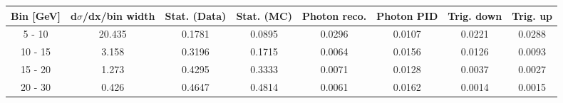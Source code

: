 \documentclass{article}
\begin{document}
\begin{table}[H]
\begin{adjustbox}{width=1\textwidth}
\begin{tabular}{|c|c|c|c|c|c|c|c|}
\hline
Bin [GeV] & d$\sigma$/dx/bin width & Stat. (Data) & Stat. (MC) & Photon reco. & Photon PID & Trig. down & Trig. up \\
\hline
5 - 10 & 20.435 & 0.1781 & 0.0895 & 0.0296 & 0.0107 & 0.0221 & 0.0288 \\
\hline
10 - 15 & 3.158 & 0.3196 & 0.1715 & 0.0064 & 0.0156 & 0.0126 & 0.0093 \\
\hline
15 - 20 & 1.273 & 0.4295 & 0.3333 & 0.0071 & 0.0128 & 0.0037 & 0.0027 \\
\hline
20 - 30 & 0.426 & 0.4647 & 0.4814 & 0.0061 & 0.0162 & 0.0014 & 0.0015 \\
\hline
\end{tabular}
\end{adjustbox}
\end{table}
\end{document}
